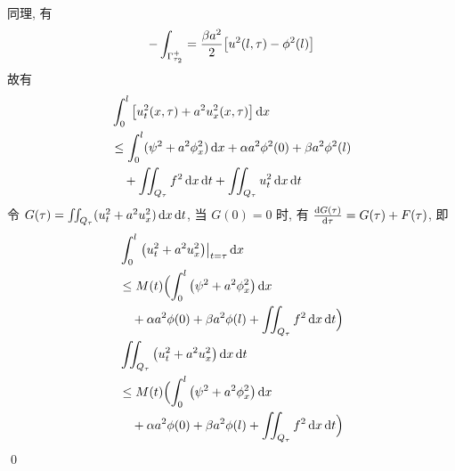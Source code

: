 \begin{solution}
\begin{align*}
\end{align*}
同理, 有
\[
-\int_{\Gamma_{\tau_2}^+} =
\frac{\beta a^2}{2} {\left[ {u^2(l, \tau) - \phi^2(l)} \right]}
\]
故有
\begin{align*}
&\int_0^l {\left[ {u_t^2(x, \tau) + a^2 u_x^2(x, \tau)} \right]} \operatorname{d\!} x \\
&\leq \int_0^l (\psi^2 + a^2 \phi_x^2) \operatorname{d\!} x + \alpha a^2 \phi^2(0)
    + \beta a^2 \phi^2(l) \\
&\quad+ \iint_{Q_\tau} f^2 \operatorname{d\!} x \operatorname{d\!} t
 + \iint_{Q_\tau} u_t^2 \operatorname{d\!} x \operatorname{d\!} t
\end{align*}
令 $G(\tau) = \iint_{Q_\tau} (u_t^2 + a^2 u_x^2) \operatorname{d\!} x \operatorname{d\!} t$, 当 $G(0)=0$
时, 有 ${\frac{\operatorname{d\!} {G(\tau)}}{\operatorname{d\!} {\tau}}} = G(\tau) + F(\tau)$, 即
\begin{align*}
&\int_0^l \mfwhen{\mclosure{u_t^2 + a^2 u_x^2}}{t=\tau} \diff x \\
&\leq M(t) \Bigl(
    \int_0^l \mclosure{\psi^2 + a^2 \phi_x^2} \diff x \\
    &\quad+ \alpha a^2 \phi(0) + \beta a^2 \phi(l)
        + \iint_{Q_\tau} f^2 \diff x \diff t \Bigr) \\
&\iint_{Q_\tau} \mclosure{u_t^2 + a^2 u_x^2} \diff x \diff t \\
&\leq M(t) \Bigl(
    \int_0^l \mclosure{\psi^2 + a^2 \phi_x^2} \diff x \\
    &\quad+ \alpha a^2 \phi(0) + \beta a^2 \phi(l)
        + \iint_{Q_\tau} f^2 \diff x \diff t \Bigr)
\end{align*}
\qed
\end{solution}
\endinput

